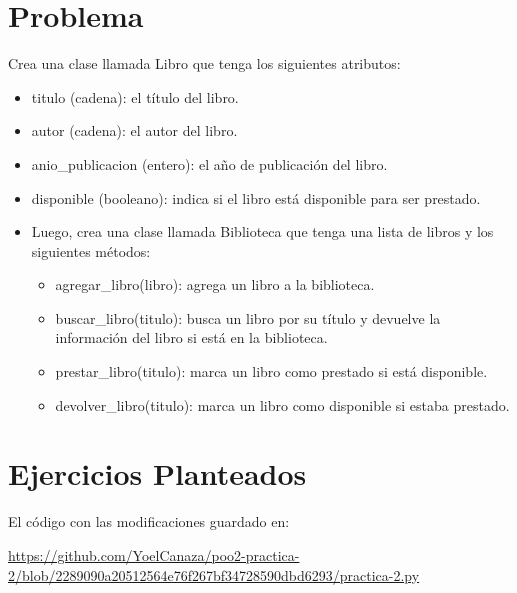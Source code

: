 \documentclass[11pt,a4paper]{article}
\begin{document}
\section{Problema}
Crea una clase llamada Libro que tenga los siguientes atributos:

\begin{itemize}
    \item titulo (cadena): el título del libro.
    \item autor (cadena): el autor del libro.
    \item anio\_publicacion (entero): el año de publicación del libro.
    \item disponible (booleano): indica si el libro está disponible para ser prestado.
    \item Luego, crea una clase llamada Biblioteca que tenga una lista de libros y los siguientes métodos:
\begin{itemize}
    \item agregar\_libro(libro): agrega un libro a la biblioteca.
    \item buscar\_libro(titulo): busca un libro por su título y devuelve la información del libro si está en la biblioteca.
    \item prestar\_libro(titulo): marca un libro como prestado si está disponible.
    \item devolver\_libro(titulo): marca un libro como disponible si estaba prestado.
\end{itemize}
\end{itemize}

\section{Ejercicios Planteados}
El código con las modificaciones guardado en:
\begin{sloppypar}
\url{https://github.com/YoelCanaza/poo2-practica-2/blob/2289090a20512564e76f267bf34728590dbd6293/practica-2.py}
\end{sloppypar}


\end{document}
